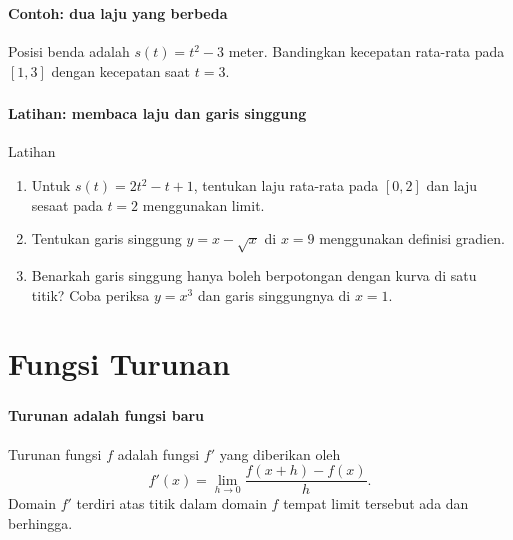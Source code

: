 \documentclass{../../kalkulus-ppt}
\begin{document}
\begin{frame}
\frametitle{\insertsection}
\framesubtitle{Contoh: dua laju yang berbeda}

\begin{contoh}
Posisi benda adalah $s(t)=t^2-3$ meter. Bandingkan kecepatan rata-rata pada $[1,3]$ dengan kecepatan saat $t=3$.
\end{contoh}
\end{frame}


\begin{frame}
\frametitle{\insertsection}
\framesubtitle{Latihan: membaca laju dan garis singgung}

\begin{exampleblock}{Latihan}
\begin{enumerate}
\item Untuk $s(t)=2t^2-t+1$, tentukan laju rata-rata pada $[0,2]$ dan laju sesaat pada $t=2$ menggunakan limit.
\item Tentukan garis singgung $y=x-\sqrt{x}$ di $x=9$ menggunakan definisi gradien.
\item Benarkah garis singgung hanya boleh berpotongan dengan kurva di satu titik? Coba periksa $y=x^3$ dan garis singgungnya di $x=1$.
\end{enumerate}
\end{exampleblock}
\end{frame}


\section{Fungsi Turunan}

\begin{frame}
\frametitle{\insertsection}
\framesubtitle{Turunan adalah fungsi baru}

\begin{definisi}
Turunan fungsi $f$ adalah fungsi $f'$ yang diberikan oleh
\[f'(x)=\lim_{h\to0}\frac{f(x+h)-f(x)}h.\]
Domain $f'$ terdiri atas titik dalam domain $f$ tempat limit tersebut ada dan berhingga.
\end{definisi}
\end{frame}
\end{document}

